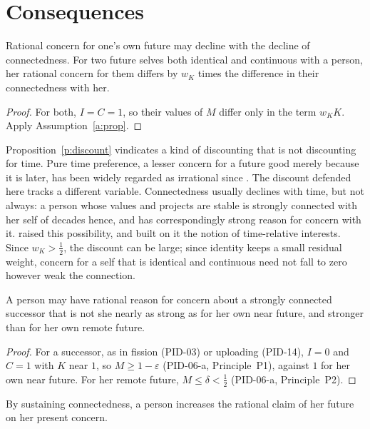 \documentclass{situationist-preprint}
\begin{document}
\section{Consequences}

\begin{proposition}\label{p:discount}
Rational concern for one's own future may decline with the decline of connectedness. For two future selves both identical and continuous with a person, her rational concern for them differs by $w_K$ times the difference in their connectedness with her.
\end{proposition}

\begin{proof}
For both, $I = C = 1$, so their values of $M$ differ only in the term $w_K K$. Apply Assumption~\ref{a:prop}.
\end{proof}

Proposition~\ref{p:discount} vindicates a kind of discounting that is not discounting for time. Pure time preference, a lesser concern for a future good merely because it is later, has been widely regarded as irrational since \citet[III.13]{Sidgwick1907}. The discount defended here tracks a different variable. Connectedness usually declines with time, but not always: a person whose values and projects are stable is strongly connected with her self of decades hence, and has correspondingly strong reason for concern with it. \citet[ch.~14]{Parfit1984} raised this possibility, and \citet{McMahan2002} built on it the notion of time-relative interests. Since $w_K > \tfrac12$, the discount can be large; since identity keeps a small residual weight, concern for a self that is identical and continuous need not fall to zero however weak the connection.

\begin{proposition}\label{p:succ}
A person may have rational reason for concern about a strongly connected successor that is not she nearly as strong as for her own near future, and stronger than for her own remote future.
\end{proposition}

\begin{proof}
For a successor, as in fission (PID-03) or uploading (PID-14), $I = 0$ and $C = 1$ with $K$ near $1$, so $M \geq 1 - \varepsilon$ (PID-06-a, Principle~P1), against $1$ for her own near future. For her remote future, $M \leq \delta < \tfrac12$ (PID-06-a, Principle~P2).
\end{proof}

\begin{proposition}\label{p:sustain}
By sustaining connectedness, a person increases the rational claim of her future on her present concern.
\end{proposition}
\end{document}

